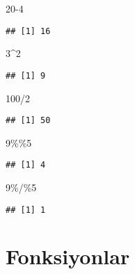 \documentclass[
]{book}
\newenvironment{Shaded}{\begin{snugshade}}{\end{snugshade}}
\newcommand{\DecValTok}[1]{\textcolor[rgb]{0.00,0.00,0.81}{#1}}
\newcommand{\SpecialCharTok}[1]{\textcolor[rgb]{0.00,0.00,0.00}{#1}}
\begin{document}
\begin{Shaded}
\begin{Highlighting}[]
\DecValTok{20{-}4}
\end{Highlighting}
\end{Shaded}

\begin{verbatim}
## [1] 16
\end{verbatim}

\begin{Shaded}
\begin{Highlighting}[]
\DecValTok{3}\SpecialCharTok{\^{}}\DecValTok{2}
\end{Highlighting}
\end{Shaded}

\begin{verbatim}
## [1] 9
\end{verbatim}

\begin{Shaded}
\begin{Highlighting}[]
\DecValTok{100}\SpecialCharTok{/}\DecValTok{2}
\end{Highlighting}
\end{Shaded}

\begin{verbatim}
## [1] 50
\end{verbatim}

\begin{Shaded}
\begin{Highlighting}[]
\DecValTok{9}\SpecialCharTok{\%\%}\DecValTok{5}
\end{Highlighting}
\end{Shaded}

\begin{verbatim}
## [1] 4
\end{verbatim}

\begin{Shaded}
\begin{Highlighting}[]
\DecValTok{9}\SpecialCharTok{\%/\%}\DecValTok{5}
\end{Highlighting}
\end{Shaded}

\begin{verbatim}
## [1] 1
\end{verbatim}

\hypertarget{fonksiyonlar}{%
\section{Fonksiyonlar}\label{fonksiyonlar}}
\end{document}
